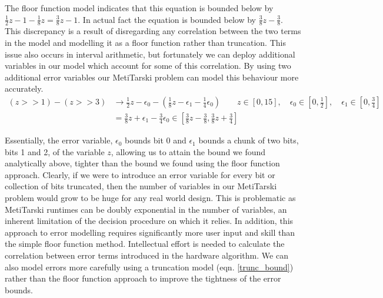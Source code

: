 \documentclass{fac}
\begin{document}
The floor function model indicates that this equation is bounded below by $\frac{1}{2}z - 1 - \frac{1}{8}z = \frac{3}{8}z - 1$. In actual fact the equation is bounded below by $\frac{3}{8}z - \frac{3}{8}$. This discrepancy is a result of disregarding any correlation between the two terms in the model and modelling it as a floor function rather than truncation. This issue also occurs in interval arithmetic, but fortunately we can deploy additional variables in our model which account for some of this correlation. By using two additional error variables our MetiTarski problem can model this behaviour more accurately.
\begin{align*}
(z>>1) - (z>>3) &\rightarrow \frac{1}{2}z - \epsilon_0 - (\frac{1}{8}z - \epsilon_1 - \frac{1}{4}\epsilon_0) \qquad z \in [0,15], \quad \epsilon_0 \in [0,\frac{1}{2}], \quad \epsilon_1 \in [0,\frac{3}{4}] \\   
                &=           \frac{3}{8}z + \epsilon_1 - \frac{3}{4}\epsilon_0 \in [\frac{3}{8}z - \frac{3}{8}, \frac{3}{8}z + \frac{3}{4}]
\end{align*}

Essentially, the error variable, $\epsilon_0$ bounds bit 0 and $\epsilon_1$ bounds a chunk of two bits, bits 1 and 2, of the variable $z$, allowing us to attain the bound we found analytically above, tighter than the bound we found using the floor function approach. Clearly, if we were to introduce an error variable for every bit or collection of bits truncated, then the number of variables in our MetiTarski problem would grow to be huge for any real world design. This is problematic as MetiTarski runtimes can be doubly exponential in the number of variables, an inherent limitation of the decision procedure on which it relies. In addition, this approach to error modelling requires significantly more user input and skill than the simple floor function method. Intellectual effort is needed to calculate the correlation between error terms introduced in the hardware algorithm. We can also model errors more carefully using a truncation model (eqn. \ref{trunc_bound}) rather than the floor function approach to improve the tightness of the error bounds. 
\end{document}
